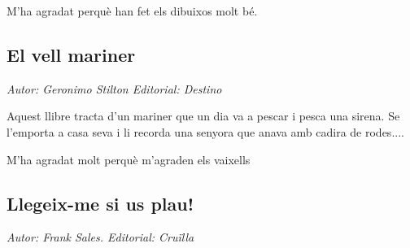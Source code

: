 \begin{news}
M’ha agradat perquè han fet els dibuixos molt bé.


\subsection*{El vell mariner}
\emph{Autor: Geronimo Stilton  Editorial: Destino}

\noindent{}

Aquest llibre tracta d’un mariner que un dia va a pescar i pesca una sirena.  Se l’emporta a casa seva i li recorda una senyora que anava amb cadira de rodes....

M’ha agradat molt perquè m’agraden els vaixells



\subsection*{Llegeix-me si us plau!}
\emph{Autor: Frank Sales.  Editorial: Cruïlla}

\noindent{}


\end{news}

